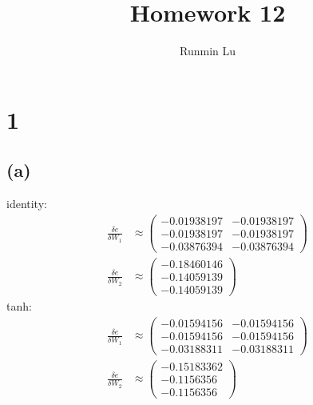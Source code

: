 \documentclass{article}
\title{Homework 12}
\author{Runmin Lu}
\begin{document}
	\maketitle
	
	\section*{1}
	\subsection*{(a)}
		identity:
		\begin{align*}
			\frac{\delta e}{\delta W_1} &\approx
			\begin{pmatrix}
				-0.01938197 & -0.01938197\\
				-0.01938197 & -0.01938197\\
				-0.03876394 & -0.03876394       			
			\end{pmatrix}\\
			\frac{\delta e}{\delta W_2} &\approx
			\begin{pmatrix}
				-0.18460146\\
				-0.14059139\\
				-0.14059139
			\end{pmatrix}
		\end{align*}
		tanh:
		\begin{align*}
			\frac{\delta e}{\delta W_1} &\approx
			\begin{pmatrix}
				-0.01594156 & -0.01594156\\
				-0.01594156 & -0.01594156\\
				-0.03188311 & -0.03188311
       		\end{pmatrix}\\
			\frac{\delta e}{\delta W_2} &\approx
			\begin{pmatrix}
				-0.15183362\\
				-0.1156356\\
				-0.1156356
			\end{pmatrix}
		\end{align*}
\end{document}
